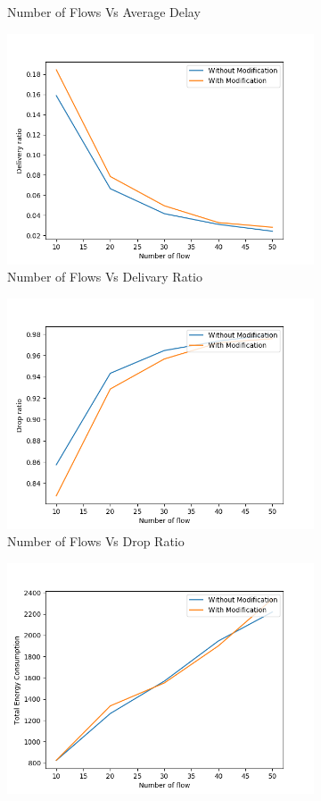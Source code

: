 \begin{figure}[h]
\begin{subfigure}{.5\textwidth}
    \caption{Number of Flows Vs Average Delay}
     \label{flow_delay_modified}
\end{subfigure}
\begin{subfigure}{.5\textwidth}
  \centering
  \includegraphics[width=.8\linewidth]{modified_fig/NumberofFlowvsDeliveryRatio.png}
     \caption{Number of Flows Vs Delivary Ratio}
     \label{flow_delivery_modified}
\end{subfigure}
\begin{subfigure}{.5\textwidth}
  \centering
  \includegraphics[width=.8\linewidth]{modified_fig/NumberofFlowvsDropRatio.png}
     \caption{Number of Flows Vs Drop Ratio}
     \label{flow_drop_modified}
\end{subfigure}
\begin{subfigure}{.5\textwidth}
  \centering
  \includegraphics[width=.8\linewidth]{modified_fig/NumberofFlowvsTotalEnergyConsumption.png}

\end{subfigure}
\end{figure}
